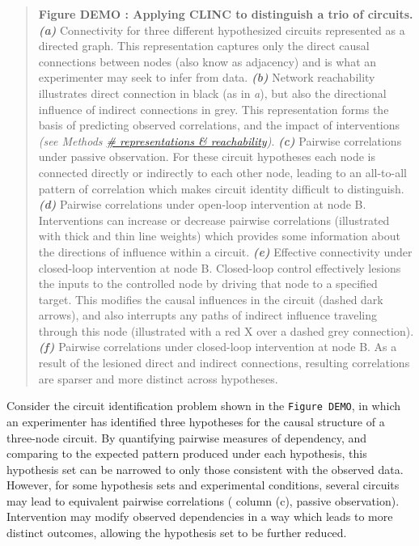 \documentclass{article}
\begin{document}
\begin{quote}
\textbf{Figure DEMO : Applying CLINC to distinguish a trio of circuits.}
\textbf{\emph{(a)}} Connectivity for three different hypothesized circuits represented as a directed graph. This representation captures only the direct causal connections between nodes (also know as adjacency) and is what an experimenter may seek to infer from data.
\textbf{\emph{(b)}} Network reachability illustrates direct connection in black (as in \emph{a}), but also the directional influence of indirect connections in grey. This representation forms the basis of predicting observed correlations, and the impact of interventions
\emph{(see Methods \href{REF-SECTION-HERE}{\# representations \&
reachability})}. \textbf{\emph{(c)}} Pairwise correlations under passive observation. For these circuit hypotheses each node is connected directly or indirectly to each other node, leading to an all-to-all pattern of correlation which makes circuit identity difficult to distinguish. \textbf{\emph{(d)}} Pairwise correlations under open-loop intervention at node B. Interventions can increase or decrease pairwise correlations (illustrated with thick and thin line weights) which provides some information about the directions of influence within a circuit. \textbf{\emph{(e)}} Effective connectivity under closed-loop intervention at node B. Closed-loop control effectively lesions the inputs to the controlled node by driving that node to a specified target. This modifies the causal influences in the circuit (dashed dark arrows), and also interrupts any paths of indirect influence traveling through this node (illustrated with a red X over a dashed grey connection). \textbf{\emph{(f)}} Pairwise correlations under closed-loop intervention at node B. As a result of the lesioned direct and indirect connections, resulting correlations are sparser and more distinct across hypotheses.
\end{quote}

Consider the circuit identification problem shown in the
\texttt{Figure\ DEMO}, in which an experimenter has identified three hypotheses for the causal structure of a three-node circuit. By quantifying pairwise measures of dependency, and comparing to the expected pattern produced under each hypothesis, this hypothesis set can be narrowed to only those consistent with the observed data. However, for some hypothesis sets and experimental conditions, several circuits may lead to equivalent pairwise correlations ( column (c), passive observation). Intervention may modify observed dependencies in a way which leads to more distinct outcomes, allowing the hypothesis set to be further reduced.
\end{document}
